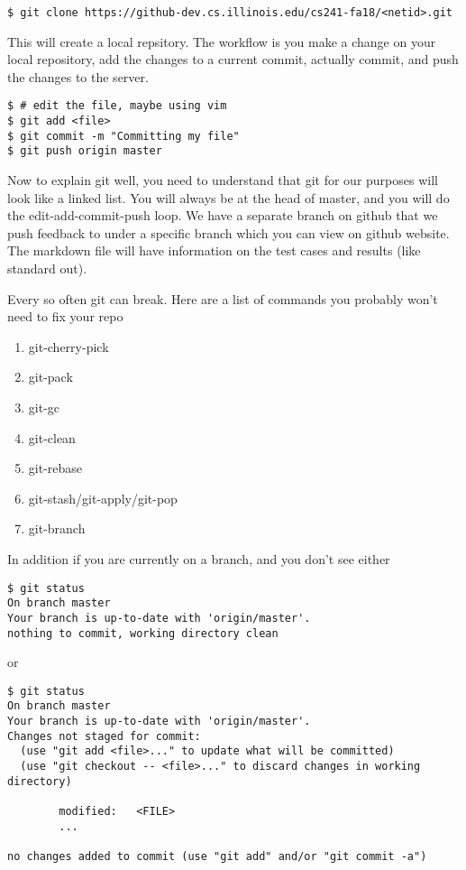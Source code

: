 \begin{lstlisting}
$ git clone https://github-dev.cs.illinois.edu/cs241-fa18/<netid>.git
\end{lstlisting}

This will create a local repsitory. The workflow is you make a change on your local repository, add the changes to a current commit, actually commit, and push the changes to the server.

\begin{lstlisting}
$ # edit the file, maybe using vim
$ git add <file>
$ git commit -m "Committing my file"
$ git push origin master
\end{lstlisting}

Now to explain git well, you need to understand that git for our purposes will look like a linked list.
You will always be at the head of master, and you will do the edit-add-commit-push loop. We have a separate branch on github that we push feedback to under a specific branch which you can view on github website. The markdown file will have information on the test cases and results (like standard out).

Every so often git can break. Here are a list of commands you probably won't need to fix your repo

\begin{enumerate}
\item git-cherry-pick
\item git-pack
\item git-gc
\item git-clean
\item git-rebase
\item git-stash/git-apply/git-pop
\item git-branch
\end{enumerate}

In addition if you are currently on a branch, and you don't see either

\begin{lstlisting}
$ git status
On branch master
Your branch is up-to-date with 'origin/master'.
nothing to commit, working directory clean
\end{lstlisting} 

or

\begin{lstlisting}
$ git status
On branch master
Your branch is up-to-date with 'origin/master'.
Changes not staged for commit:
  (use "git add <file>..." to update what will be committed)
  (use "git checkout -- <file>..." to discard changes in working directory)

        modified:   <FILE>
        ...

no changes added to commit (use "git add" and/or "git commit -a")
\end{lstlisting}

